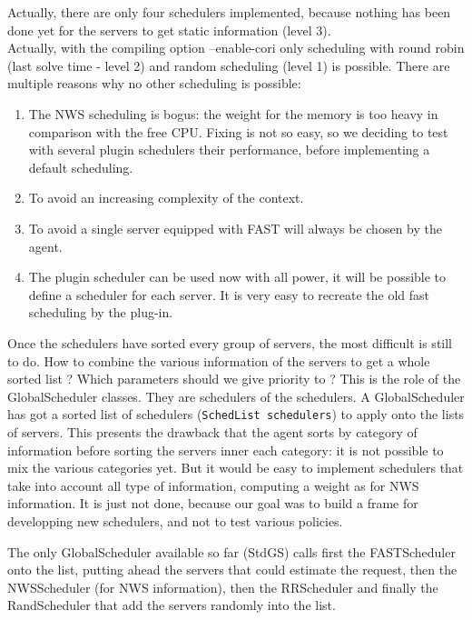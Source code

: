   Actually, there are only four schedulers implemented, because nothing has been
  done yet for the servers to get static information (level 3).\\
  Actually, with the compiling option --enable-cori only scheduling with round
  robin (last solve time - level 2) and random scheduling (level 1) is possible.
  There are multiple reasons why no other scheduling is possible:
\begin{enumerate}
  \item The NWS scheduling is bogus: the weight for the memory is too
  heavy in comparison with the free CPU. Fixing is not so easy, so
  we deciding to test with several plugin schedulers their
  performance, before implementing a default scheduling.
  \item To avoid an increasing complexity of the context.
  \item To avoid a single server equipped with FAST will always be chosen by
  the agent.
  \item The plugin scheduler can be used now with all power, it will
  be possible to define a scheduler for each server. It is very easy to recreate the old 
fast scheduling by the plug-in.
  \end{enumerate}


  Once the schedulers have sorted every group of servers, the most difficult is
  still to do. How to combine the various information of the servers to get a
  whole sorted list ? Which parameters should we give priority to ? This is the
  role of the \textsf{GlobalScheduler} classes. They are schedulers of the
  schedulers. A \textsf{GlobalScheduler} has got a sorted list of schedulers
  (\texttt{SchedList schedulers}) to apply onto the lists of servers. This
  presents the drawback that the agent sorts by category of information before
  sorting the servers inner each category: it is not possible to mix the various
  categories yet. But it would be easy to implement schedulers that take into
  account all type of information, computing a weight as for NWS information. It
  is just not done, because our goal was to build a frame for developping new
  schedulers, and not to test various policies.

  The only \textsf{GlobalScheduler} available so far (\textsf{StdGS}) calls first
  the \textsf{FASTScheduler} onto the list, putting ahead the servers that could
  estimate the request, then the \textsf{NWSScheduler} (for NWS information), then
  the \textsf{RRScheduler} and finally the \textsf{RandScheduler} that add the
  servers randomly into the list.
  \\

